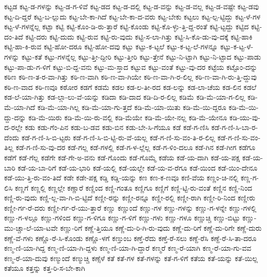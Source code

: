 {ಕಟ್ಟಡ
ಕಟ್ಟ-ಡ-ಗಳನ್ನು
ಕಟ್ಟ-ಡ-ಗ-ಳಿವೆ
ಕಟ್ಟ-ಡದ
ಕಟ್ಟ-ಡ-ದಲ್ಲಿ
ಕಟ್ಟ-ಡ-ವನ್ನು
ಕಟ್ಟ-ಡ-ವಲ್ಲ
ಕಟ್ಟ-ಡ-ವಷ್ಟೇ
ಕಟ್ಟ-ಡವು
ಕಟ್ಟ-ದಿ-ದ್ದರೆ
ಕಟ್ಟ-ಬ-ಲ್ಲುದು
ಕಟ್ಟ-ಬೇ-ಕಾ-ಗಿದೆ
ಕಟ್ಟ-ಬೇ-ಕಾ-ದ-ವರು
ಕಟ್ಟ-ಬೇಕು
ಕಟ್ಟಲು
ಕಟ್ಟ-ಲ್ಪ-ಟ್ಟಿದ್ದು
ಕಟ್ಟ-ಳೆ-ಗಳ
ಕಟ್ಟ-ಳೆ-ಗಳನ್ನೆಲ್ಲ
ಕಟ್ಟಾ
ಕಟ್ಟಿ
ಕಟ್ಟಿ-ಕೊಂ-ಡಿ-ರು-ತ್ತಾರೆ
ಕಟ್ಟಿ-ಕೊಂಡು
ಕಟ್ಟಿ-ಕೊ-ಳ್ಳು-ತ್ತಿ-ದ್ದ-ರಂತೆ
ಕಟ್ಟಿ-ಟ್ಟದ್ದು
ಕಟ್ಟಿದ
ಕಟ್ಟಿ-ದಂ-ತಿದೆ
ಕಟ್ಟಿ-ದರು
ಕಟ್ಟಿ-ದುದು
ಕಟ್ಟಿ-ರುವ
ಕಟ್ಟಿ-ರು-ವುದು
ಕಟ್ಟಿ-ಸ-ಲಾ-ಗಿತ್ತು
ಕಟ್ಟಿ-ಸಿ-ಕೊ-ಡು-ವು-ದಕ್ಕೆ
ಕಟ್ಟಿ-ಹಾಕಿ
ಕಟ್ಟಿ-ಹಾ-ಕಿ-ರುವ
ಕಟ್ಟಿ-ಹೋ-ದರೂ
ಕಟ್ಟಿ-ಹೋ-ದವು
ಕಟ್ಟು
ಕಟ್ಟು-ಕ-ಟ್ಟಲೆ
ಕಟ್ಟು-ಕ-ಟ್ಟ-ಲೆ-ಗಳನ್ನೂ
ಕಟ್ಟು-ಕ-ಟ್ಟ-ಳೆ-ಗಳನ್ನು
ಕಟ್ಟು-ಕತೆ
ಕಟ್ಟು-ಗಳನ್ನೆಲ್ಲ
ಕಟ್ಟು-ತ್ತೀ-ದ್ದೀರಿ
ಕಟ್ಟು-ತ್ತೀರಿ
ಕಟ್ಟು-ತ್ತೇನೆ
ಕಟ್ಟು-ನಿ-ಟ್ಟಾಗಿ
ಕಟ್ಟು-ನಿ-ಟ್ಟಾದ
ಕಟ್ಟು-ಪಾಡು
ಕಟ್ಟು-ಪಾ-ಡು-ಗ-ಳಿಗೆ
ಕಟ್ಟು-ಬಿ-ದ್ದ-ವನು
ಕಟ್ಟು-ಮ-ಸ್ತಾದ
ಕಟ್ಟುವ
ಕಟ್ಟು-ವಂತೆ
ಕಟ್ಟು-ವು-ದರ
ಕಟ್ಟೆಯ
ಕಟ್ಟೊಂ-ದನ್ನು
ಕಠಿಣ
ಕಠಿ-ಣ-ತ-ರ-ವಾ-ಗಿತ್ತು
ಕಠಿ-ಣ-ವಾಗಿ
ಕಠಿ-ಣ-ವಾ-ಗಿಯೇ
ಕಠಿ-ಣ-ವಾ-ಗಿ-ರ-ಲಿಲ್ಲ
ಕಠಿ-ಣ-ವಾ-ಗಿ-ರು-ತ್ತಿ-ದ್ದುವು
ಕಠಿ-ಣ-ವಾದ
ಕಠಿ-ಣವೂ
ಕಠೋರ
ಕಡಗೆ
ಕಡಮೆ
ಕಡಲ
ಕಡ-ಲ-ತೀ-ರದ
ಕಡ-ಲನ್ನು
ಕಡ-ಲಾ-ಚೆಯ
ಕಡ-ಲಿನ
ಕಡಲೆ
ಕಡ-ಲೆ-ಯಾ-ಗಿತ್ತು
ಕಡ-ಲ್ಗಾ-ಲು-ವೆ-ಯನ್ನು
ಕಡಿದಾ
ಕಡಿ-ದಾದ
ಕಡಿ-ದಿ-ರ-ಲಿಲ್ಲ
ಕಡಿಮೆ
ಕಡಿ-ಮೆ-ಯಾ-ಗ-ಲಿಲ್ಲ
ಕಡಿ-ಮೆ-ಯಾ-ಗಿದೆ
ಕಡಿ-ಮೆ-ಯಾ-ಗಿಲ್ಲ
ಕಡಿ-ಮೆ-ಯಾ-ಗು-ತ್ತದೆ
ಕಡಿ-ಮೆ-ಯಾ-ಯಿತು
ಕಡಿ-ಮೆ-ಯಿ-ದ್ದರೂ
ಕಡಿ-ಮೆ-ಯಿ-ದ್ದು-ದನ್ನು
ಕಡಿ-ಮೆ-ಯಿರು
ಕಡಿ-ಮೆ-ಯಿ-ರು-ವಲ್ಲಿ
ಕಡಿ-ಮೆಯೇ
ಕಡಿ-ಮೆ-ಯೇ-ನಲ್ಲ
ಕಡಿ-ಮೆ-ಯೇನೂ
ಕಡಿ-ಯು-ವು-ದ-ರಲ್ಲೇ
ಕಡು
ಕಡು-ಗೆಂ-ಪಿನ
ಕಡು-ಬ-ಡವ
ಕಡು-ಬಿನ
ಕಡು-ಬೇ-ಸಿ-ಗೆಯೂ
ಕಡೆ
ಕಡೆ-ಗ-ಣಿಸಿ
ಕಡೆ-ಗ-ಣಿ-ಸಿ-ಬಾ-ರ-ದೆಂದು
ಕಡೆ-ಗ-ಣಿ-ಸಿ-ಬಿ-ಟ್ಟರು
ಕಡೆ-ಗ-ಣಿ-ಸಿ-ಬಿ-ಟ್ಟಿ-ರು-ವೆ-ಯಲ್ಲ
ಕಡೆ-ಗ-ಣಿ-ಸು-ವಂ-ತಿ-ರ-ಲಿಲ್ಲ
ಕಡೆ-ಗ-ಣಿ-ಸು-ವಂ-ತಿಲ್ಲ
ಕಡೆ-ಗ-ಣಿ-ಸು-ವು-ದರ
ಕಡೆ-ಗಲ್ಲ
ಕಡೆ-ಗಳಲ್ಲಿ
ಕಡೆ-ಗ-ಳ-ಲ್ಲೆಲ್ಲ
ಕಡೆ-ಗ-ಳಿಂ-ದಲೂ
ಕಡೆ-ಗಿನ
ಕಡೆ-ಗೀಗ
ಕಡೆಗೂ
ಕಡೆಗೆ
ಕಡೆ-ಗೆಲ್ಲ
ಕಡೆಗೇ
ಕಡೆ-ಗೇ-ಅ-ವನು
ಕಡೆ-ಗೊಂದು
ಕಡೆ-ಗೊಮ್ಮೆ
ಕಡೆಯ
ಕಡೆ-ಯ-ದಾಗಿ
ಕಡೆ-ಯ-ಪಕ್ಷ
ಕಡೆ-ಯ-ಬಾರಿ
ಕಡೆ-ಯ-ಬಾ-ರಿಗೆ
ಕಡೆ-ಯ-ಭಾರಿ
ಕಡೆ-ಯಲ್ಲಿ
ಕಡೆ-ಯಲ್ಲೇ
ಕಡೆ-ಯ-ವ-ರೆಗೂ
ಕಡೆ-ಯಿಂದ
ಕಡೆ-ಯಿಂ-ದೇನೂ
ಕಡೆ-ಯು-ತ್ತಿ-ರು-ವಂ-ತಿದೆ
ಕಡೇ
ಕಡೇ-ಪಕ್ಷ
ಕಡ್ಡಿ
ಕಡ್ಡಿ-ಯನ್ನು
ಕಣ
ಕಣ-ಕ-ಣವೂ
ಕಣಿ-ವೆಯ
ಕಣ್ಣಂ-ಚಿ-ನಲ್ಲಿ
ಕಣ್ಣ-ಗ-ಲಿಸಿ
ಕಣ್ಣಗೆ
ಕಣ್ಣಲ್ಲಿ
ಕಣ್ಣಲ್ಲೇ
ಕಣ್ಣಾರೆ
ಕಣ್ಣಿಂದ
ಕಣ್ಣಿ-ಗಂತೂ
ಕಣ್ಣಿಗೂ
ಕಣ್ಣಿಗೆ
ಕಣ್ಣಿ-ಟ್ಟಿ-ರು-ವಂತೆ
ಕಣ್ಣಿನ
ಕಣ್ಣಿ-ನಿಂದ
ಕಣ್ಣಿ-ರು-ವುದು
ಕಣ್ಣಿ-ಲ್ಲ-ವಾ-ಗಿ-ಬಿ-ಟ್ಟಿದೆ
ಕಣ್ಣೀ-ರನ್ನು
ಕಣ್ಣೀ-ರನ್ನೂ
ಕಣ್ಣೀ-ರಲ್ಲಿ
ಕಣ್ಣೀ-ರಾಗಿ
ಕಣ್ಣೀ-ರಿ-ನಿಂದ
ಕಣ್ಣೀರು
ಕಣ್ಣೀ-ರ್ಗ-ರೆ-ದರು
ಕಣ್ಣೀ-ರ್ಗ-ರೆ-ಯು-ತ್ತಾರೆ
ಕಣ್ಣು
ಕಣ್ಣುಂದೆ
ಕಣ್ಣು-ಗಳ
ಕಣ್ಣು-ಗಳನ್ನು
ಕಣ್ಣು-ಗ-ಳನ್ನೇ
ಕಣ್ಣು-ಗಳಲ್ಲಿ
ಕಣ್ಣು-ಗ-ಳಲ್ಲೂ
ಕಣ್ಣು-ಗಳಿಂದ
ಕಣ್ಣು-ಗ-ಳಿಗೂ
ಕಣ್ಣು-ಗ-ಳಿಗೆ
ಕಣ್ಣು-ಗಳು
ಕಣ್ಣು-ಗಳೂ
ಕಣ್ಣುಚ್ಚಿ
ಕಣ್ಣು-ಬಿಟ್ಟು
ಕಣ್ಣು-ಮು-ಚ್ಚಾ-ಲೆ-ಯಾ-ಟವೇ
ಕಣ್ಣು-ರಿಗೆ
ಕಣ್ಣೆ-ತ್ತಿಯೂ
ಕಣ್ಣೆ-ದು-ರಿ-ಗಿ-ರು-ವುದು
ಕಣ್ಣೆ-ದು-ರಿಗೆ
ಕಣ್ಣೆ-ದು-ರಿಗೇ
ಕಣ್ಣೆ-ದುರು
ಕಣ್ಣೆ-ವೆ-ಗಳು
ಕಣ್ಣೊ-ರೆ-ಸಿ-ಕೊಂಡು
ಕಣ್ಣೊ-ಳಗೆ
ಕಣ್ತುಂಬ
ಕಣ್ತೆ-ರೆದು
ಕಣ್ತೆ-ರೆ-ಸಲು
ಕಣ್ದೆ-ರೆಸಿ
ಕಣ್ದೆ-ರೆ-ಸಿ-ತಾ-ದರೂ
ಕಣ್ಮ-ಣಿ-ಯಾ-ಗಿದ್ದ
ಕಣ್ಮ-ಣಿ-ಯಾ-ಗಿ-ದ್ದಳು
ಕಣ್ಮ-ಣಿ-ಯಾ-ಗಿ-ದ್ದಾರೆ
ಕಣ್ಮರೆ
ಕಣ್ಮ-ರೆ-ಯಾಗಿ
ಕಣ್ಮ-ರೆ-ಯಾ-ಗು-ವವ
ಕಣ್ಮ-ರೆ-ಯಾ-ದುವು
ಕಣ್ಮುಂದೆ
ಕಣ್ಮುಚ್ಚಿ
ಕಣ್ಸೆಳೆ
ಕತೆ
ಕತೆ-ಗಳ
ಕತೆ-ಗಳನ್ನು
ಕತೆ-ಗ-ಳಿಗೆ
ಕತೆಯ
ಕತೆ-ಯನ್ನು
ಕತೆ-ಯಿಲ್ಲ
ಕತೆಯೂ
ಕತ್ತನ್ನು
ಕತ್ತ-ರಿ-ಸ-ಬೇ-ಕಾಗಿ
}
